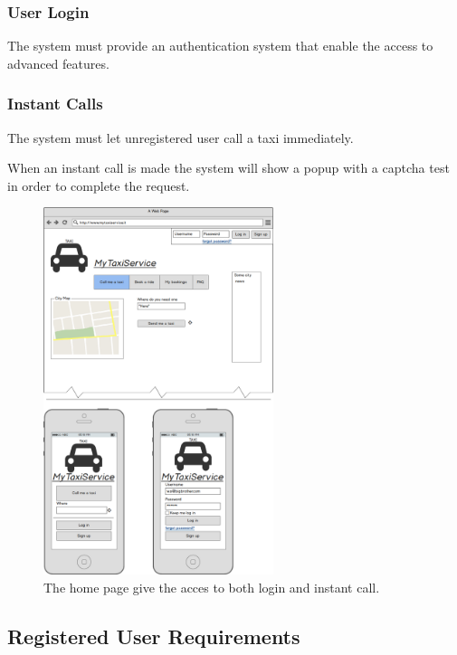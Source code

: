 		\subsubsection {User Login}
		 	The system must provide an authentication system that enable the access to advanced features.
		\subsubsection {Instant Calls}
			The system must let unregistered user call a taxi immediately.

			When an instant call is made the system will show a popup with a captcha test in order to complete the request.
			\begin{figure}[h!]
				\includegraphics[width=0.6\textwidth]{mockup/home}
				\caption{The home page give the acces to both login and instant call.}
			\end{figure}
			\newpage
	\subsection {Registered User Requirements}
